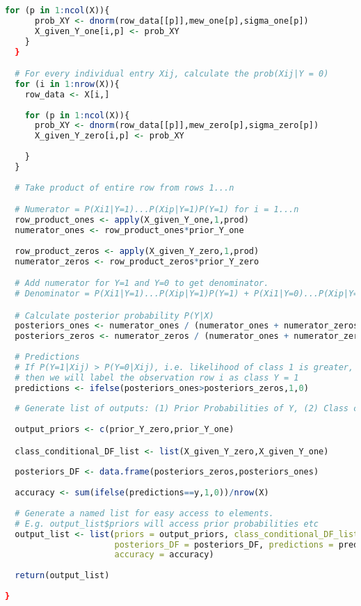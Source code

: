 \documentclass{article}
\begin{document}
\begin{lstlisting}[language=R]
    for (p in 1:ncol(X)){
      prob_XY <- dnorm(row_data[[p]],mew_one[p],sigma_one[p])
      X_given_Y_one[i,p] <- prob_XY
    }    
  }

  # For every individual entry Xij, calculate the prob(Xij|Y = 0)  
  for (i in 1:nrow(X)){
    row_data <- X[i,] 
    
    for (p in 1:ncol(X)){
      prob_XY <- dnorm(row_data[[p]],mew_zero[p],sigma_zero[p])
      X_given_Y_zero[i,p] <- prob_XY
      
    }    
  }
  
  # Take product of entire row from rows 1...n

  # Numerator = P(Xi1|Y=1)...P(Xip|Y=1)P(Y=1) for i = 1...n
  row_product_ones <- apply(X_given_Y_one,1,prod) 
  numerator_ones <- row_product_ones*prior_Y_one
  
  row_product_zeros <- apply(X_given_Y_zero,1,prod)
  numerator_zeros <- row_product_zeros*prior_Y_zero 

  # Add numerator for Y=1 and Y=0 to get denominator.
  # Denominator = P(Xi1|Y=1)...P(Xip|Y=1)P(Y=1) + P(Xi1|Y=0)...P(Xip|Y=1)P(Y=0)

  # Calculate posterior probability P(Y|X)  
  posteriors_ones <- numerator_ones / (numerator_ones + numerator_zeros)
  posteriors_zeros <- numerator_zeros / (numerator_ones + numerator_zeros)
  
  # Predictions
  # If P(Y=1|Xij) > P(Y=0|Xij), i.e. likelihood of class 1 is greater, 
  # then we will label the observation row i as class Y = 1
  predictions <- ifelse(posteriors_ones>posteriors_zeros,1,0)
  
  # Generate list of outputs: (1) Prior Probabilities of Y, (2) Class conditional probabilities P(Xij|Y=k), (3) Posterior probabilities, (4) Predicted Labels for each data row, (5) accuracy
  
  output_priors <- c(prior_Y_zero,prior_Y_one)

  class_conditional_DF_list <- list(X_given_Y_zero,X_given_Y_one)
  
  posteriors_DF <- data.frame(posteriors_zeros,posteriors_ones)
  
  accuracy <- sum(ifelse(predictions==y,1,0))/nrow(X)
  
  # Generate a named list for easy access to elements. 
  # E.g. output_list$priors will access prior probabilities etc
  output_list <- list(priors = output_priors, class_conditional_DF_list = class_conditional_DF_list,
                      posteriors_DF = posteriors_DF, predictions = predictions,
                      accuracy = accuracy)
  
  return(output_list)
  
}
\end{lstlisting}
\end{document}
